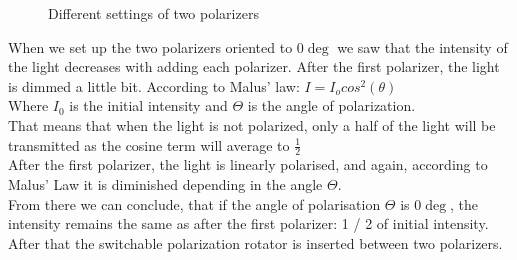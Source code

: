 \documentclass[english]{article}
\begin{document}
\begin{figure}[H]
	\centering
	\caption{Different settings of two polarizers}
	\label{fig:six}
\end{figure}
When we set up the two polarizers oriented to $0\deg$ we saw that the intensity of the light decreases with adding each polarizer. 
After the first polarizer, the light is dimmed a little bit. According to Malus' law:
$I=I_ocos^2(θ)$\\
Where $I_0$ is the initial intensity and $\Theta$ is the angle of polarization.\\
That means that when the light is not polarized, only a half of the light will be transmitted as the cosine term will average to $\frac{1}{2}$\\
After the first polarizer, the light is linearly polarised, and again, according to Malus' Law it is diminished depending in the angle $\Theta$.\\
From there we can conclude, that if the angle of polarisation $\Theta$ is $0\deg$, the intensity remains the same as after the first polarizer: 1 / 2 of initial intensity. \\
After that the switchable polarization rotator is inserted between two polarizers.
\end{document}
